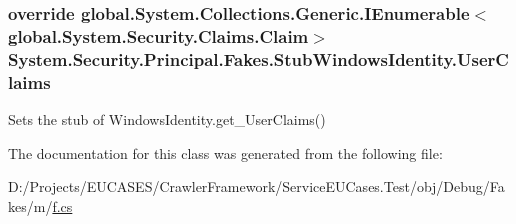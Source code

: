 \hypertarget{class_system_1_1_security_1_1_principal_1_1_fakes_1_1_stub_windows_identity_a5629a5622902f26ee4a8d835bda1f729}{
\subsubsection[{User\-Claims}]{\setlength{\rightskip}{0pt plus 5cm}override global.\-System.\-Collections.\-Generic.\-I\-Enumerable$<$global.\-System.\-Security.\-Claims.\-Claim$>$ System.\-Security.\-Principal.\-Fakes.\-Stub\-Windows\-Identity.\-User\-Claims\hspace{0.3cm}{\ttfamily [get]}}}\label{class_system_1_1_security_1_1_principal_1_1_fakes_1_1_stub_windows_identity_a5629a5622902f26ee4a8d835bda1f729}


Sets the stub of Windows\-Identity.\-get\-\_\-\-User\-Claims()



The documentation for this class was generated from the following file\-:\begin{DoxyCompactItemize}
\item 
D\-:/\-Projects/\-E\-U\-C\-A\-S\-E\-S/\-Crawler\-Framework/\-Service\-E\-U\-Cases.\-Test/obj/\-Debug/\-Fakes/m/\hyperlink{m_2f_8cs}{f.\-cs}\end{DoxyCompactItemize}

